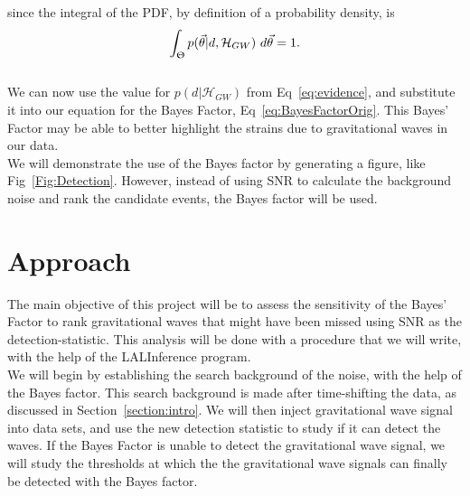 \documentclass{article}
\begin{document}
since the integral of the PDF, by definition of a probability density, is $$\int_{\Uptheta} p(\vec{\theta}|d, \mathcal{H}_{GW})\ d\vec{\theta}  = 1 .$$ \\

We can now use the value for $p(d|\mathcal{H}_{GW})$ from  Eq~\ref{eq:evidence}, and substitute it into our equation for the Bayes Factor, Eq~\ref{eq:BayesFactorOrig}. This Bayes' Factor may be able to better highlight the strains due to gravitational waves in our data.\\

We will demonstrate the use of the Bayes factor by generating a figure, like Fig~\ref{Fig:Detection}. However, instead of using SNR to calculate the background noise and rank the candidate events, the Bayes factor will be used. %
 
 
 \section{Approach}
 The main objective of this project will be to assess the sensitivity of the Bayes' Factor to rank gravitational waves that might have been missed using SNR as the detection-statistic. This analysis will be done with a procedure that we will write, with the help of the LALInference program.\\
 
 We will begin by establishing the search background of the noise, with the help of the Bayes factor. This search background is made after time-shifting the data, as discussed in Section~\ref{section:intro}.  We will then inject gravitational wave signal into data sets, and use the new detection statistic to study if it can detect the waves. If the Bayes Factor is unable to detect the gravitational wave signal, we will study the thresholds at which the the gravitational wave signals can finally be detected with the Bayes factor. \\
 
\end{document}

